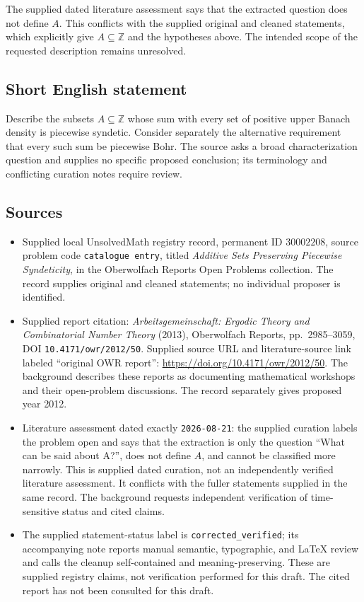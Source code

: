 \documentclass[11pt]{article}
\newcommand{\Z}{\mathbb{Z}}
\begin{document}
The supplied dated literature assessment says that the extracted question does not define \(A\). This conflicts with the supplied original and cleaned statements, which explicitly give \(A\subseteq\Z\) and the hypotheses above. The intended scope of the requested description remains unresolved.
\subsection{Short English statement}
Describe the subsets \(A\subseteq\Z\) whose sum with every set of positive upper Banach density is piecewise syndetic. Consider separately the alternative requirement that every such sum be piecewise Bohr. The source asks a broad characterization question and supplies no specific proposed conclusion; its terminology and conflicting curation notes require review.
\subsection{Sources}
\begin{itemize}
\item Supplied local UnsolvedMath registry record, permanent ID \(30002208\), source problem code \texttt{catalogue entry}, titled \emph{Additive Sets Preserving Piecewise Syndeticity}, in the Oberwolfach Reports Open Problems collection. The record supplies original and cleaned statements; no individual proposer is identified.
\item Supplied report citation: \emph{Arbeitsgemeinschaft: Ergodic Theory and Combinatorial Number Theory} (2013), Oberwolfach Reports, pp.~2985--3059, DOI \texttt{10.4171/owr/2012/50}. Supplied source URL and literature-source link labeled ``original OWR report'': \url{https://doi.org/10.4171/owr/2012/50}. The background describes these reports as documenting mathematical workshops and their open-problem discussions. The record separately gives proposed year 2012.
\item Literature assessment dated exactly \texttt{2026-08-21}: the supplied curation labels the problem open and says that the extraction is only the question ``What can be said about A?'', does not define \(A\), and cannot be classified more narrowly. This is supplied dated curation, not an independently verified literature assessment. It conflicts with the fuller statements supplied in the same record. The background requests independent verification of time-sensitive status and cited claims.
\item The supplied statement-status label is \texttt{corrected\_verified}; its accompanying note reports manual semantic, typographic, and LaTeX review and calls the cleanup self-contained and meaning-preserving. These are supplied registry claims, not verification performed for this draft. The cited report has not been consulted for this draft.
\end{itemize}
\end{document}
